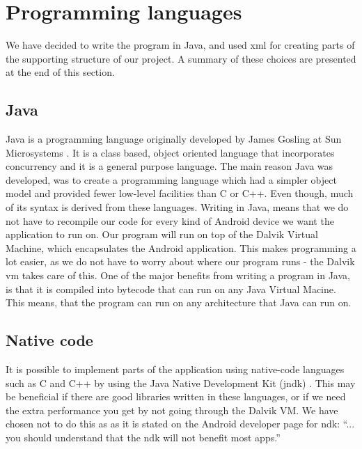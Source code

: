 \newpage

\section{Programming languages}
We have decided to write the program in Java, and used \gls{xml} for creating parts of the supporting structure of our project. A summary of these choices are presented at the end of this section.

\subsection{Java}

Java is a programming language originally developed by James Gosling at Sun Microsystems \cite{bib:java}. It is a class based, object oriented language that incorporates concurrency and it is a general purpose language. The main reason Java was developed, was to create a programming language which had a simpler object model and provided fewer low-level facilities than C or C++. Even though, much of its syntax is derived from these languages.
\newline
\newline
Writing in Java, means that we do not have to recompile our code for every kind of Android device we want the application to run on. Our program will run on top of the Dalvik Virtual Machine, which encapsulates the Android application. This makes programming a lot easier, as we do not have to worry about where our program runs - the Dalvik \gls{vm} takes care of this.
\newline
\newline
One of the major benefits from writing a program in Java, is that it is compiled into bytecode that can run on any Java Virtual Macine. This means, that the program can run on any architecture that Java can run on.

\subsection{Native code}
It is possible to implement parts of the application using native-code languages such as C and C++ by using the Java Native Development Kit (\gls{jndk}) \cite{bib:andk}. This may be beneficial if there are good libraries written in these languages, or if we need the extra performance you get by not going through the Dalvik VM. We have chosen not to do this as as it is stated on the Android developer page for \gls{ndk}: “... you should understand that the \gls{ndk} will not benefit most apps.”

